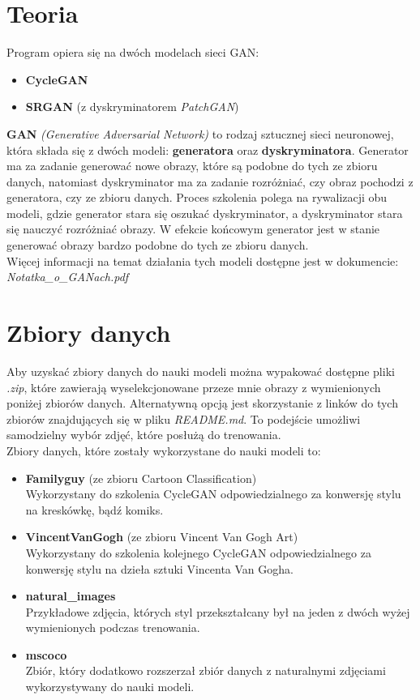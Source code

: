 \documentclass{article}
\begin{document}
\section{Teoria}
Program opiera się na dwóch modelach sieci GAN:
\begin{itemize}
    \setlength\itemsep{0pt}
    \item \textbf{CycleGAN}
    \item \textbf{SRGAN} (z dyskryminatorem \textit{PatchGAN})
\end{itemize}
\textbf{GAN} \textit{(Generative Adversarial Network)} to rodzaj sztucznej sieci neuronowej, która składa się z dwóch modeli: \textbf{generatora} oraz \textbf{dyskryminatora}.
Generator ma za zadanie generować nowe obrazy, które są podobne do tych ze zbioru danych, natomiast dyskryminator ma za zadanie rozróżniać, czy obraz pochodzi z generatora, czy ze zbioru danych.
Proces szkolenia polega na rywalizacji obu modeli, gdzie generator stara się oszukać dyskryminator, a dyskryminator stara się nauczyć rozróżniać obrazy.
W efekcie końcowym generator jest w stanie generować obrazy bardzo podobne do tych ze zbioru danych.
\vspace{3mm} \\
Więcej informacji na temat działania tych modeli dostępne jest w dokumencie: \textit{Notatka\_o\_GANach.pdf}

\section{Zbiory danych}
Aby uzyskać zbiory danych do nauki modeli można wypakować dostępne pliki \textit{.zip}, które zawierają wyselekcjonowane przeze mnie obrazy z wymienionych poniżej zbiorów danych. Alternatywną opcją jest skorzystanie z linków do tych zbiorów znajdujących się w pliku \textit{README.md}. To podejście umożliwi samodzielny wybór zdjęć, które posłużą do trenowania.
\vspace{3mm} \\
Zbiory danych, które zostały wykorzystane do nauki modeli to:
\begin{itemize}
    \item \textbf{Familyguy} (ze zbioru Cartoon Classification) \\
Wykorzystany do szkolenia CycleGAN odpowiedzialnego za konwersję stylu na kreskówkę, bądź komiks.
    \item \textbf{VincentVanGogh} (ze zbioru Vincent Van Gogh Art) \\
Wykorzystany do szkolenia kolejnego CycleGAN odpowiedzialnego za konwersję stylu na dzieła sztuki Vincenta Van Gogha.
    \item \textbf{natural\_images} \\
Przykładowe zdjęcia, których styl przekształcany był na jeden z dwóch wyżej wymienionych podczas trenowania.
    \item \textbf{mscoco} \\
Zbiór, który dodatkowo rozszerzał zbiór danych z naturalnymi zdjęciami wykorzystywany do nauki modeli.
\end{itemize}
\end{document}
